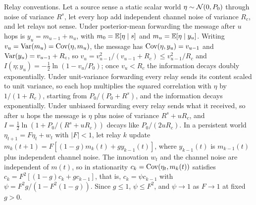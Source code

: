 Relay conventions. Let a source sense a static scalar world $\eta\sim\mathcal{N}(0,P_0)$ through noise of variance $R^s$, let every hop add independent channel noise of variance $R_c$, and let relays not sense. Under posterior-mean forwarding the message after $u$ hops is $y_u=m_{u-1}+n_u$, with $m_0=\mathbb{E}[\eta\mid s]$ and $m_u=\mathbb{E}[\eta\mid y_u]$. Writing $v_u=\operatorname{Var}(m_u)=\operatorname{Cov}(\eta,m_u)$, the message has $\operatorname{Cov}(\eta,y_u)=v_{u-1}$ and $\operatorname{Var}(y_u)=v_{u-1}+R_c$, so $v_u=v_{u-1}^2/(v_{u-1}+R_c)\le v_{u-1}^2/R_c$ and $I(\eta;y_u)=-\frac12\ln(1-v_u/P_0)$; once $v_u<R_c$ the information decays doubly exponentially. Under unit-variance forwarding every relay sends its content scaled to unit variance, so each hop multiplies the squared correlation with $\eta$ by $1/(1+R_c)$, starting from $P_0/(P_0+R^s)$, and the information decays exponentially. Under unbiased forwarding every relay sends what it received, so after $u$ hops the message is $\eta$ plus noise of variance $R^s+uR_c$, and $I=\frac12\ln(1+P_0/(R^s+uR_c))$ decays like $P_0/(2uR_c)$. In a persistent world $\eta_{t+1}=F\eta_t+w_t$ with $|F|<1$, let relay $k$ update $m_k(t+1)=F[(1-g)m_k(t)+gy_{k-1}(t)]$, where $y_{k-1}(t)$ is $m_{k-1}(t)$ plus independent channel noise. The innovation $w_t$ and the channel noise are independent of $m(t)$, so in stationarity $c_k=\operatorname{Cov}(\eta_t,m_k(t))$ satisfies $c_k=F^2[(1-g)c_k+gc_{k-1}]$, that is, $c_k=\psi c_{k-1}$ with $\psi=F^2g/(1-F^2(1-g))$. Since $g\le1$, $\psi\le F^2$, and $\psi\to1$ as $F\to1$ at fixed $g>0$.

